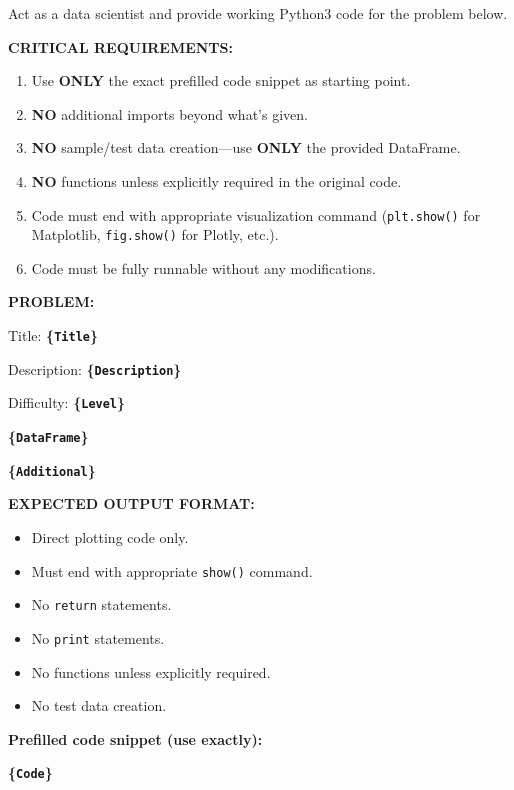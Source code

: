 \documentclass[conference]{IEEEtran}
\begin{document}
\begin{tcolorbox}[title=Prompt Template for Visualization Problems, colback=white, colframe=black]
\scriptsize
Act as a data scientist and provide working Python3 code for the problem below.

\textbf{CRITICAL REQUIREMENTS:}

\begin{enumerate}
    \item Use \textbf{ONLY} the exact prefilled code snippet as starting point.
    \item \textbf{NO} additional imports beyond what's given.
    \item \textbf{NO} sample/test data creation—use \textbf{ONLY} the provided DataFrame.
    \item \textbf{NO} functions unless explicitly required in the original code.
    \item Code must end with appropriate visualization command (\texttt{plt.show()} for Matplotlib, \texttt{fig.show()} for Plotly, etc.).
    \item Code must be fully runnable without any modifications.
\end{enumerate}

\textbf{PROBLEM:}

Title: \textbf{\{\texttt{Title}\}}

Description: \textbf{\{\texttt{Description}\}}

Difficulty: \textbf{\{\texttt{Level}\}}

\textbf{\{\texttt{DataFrame}\}}

\textbf{\{\texttt{Additional}\}}

\textbf{EXPECTED OUTPUT FORMAT:}

\begin{itemize}
    \item Direct plotting code only.
    \item Must end with appropriate \texttt{show()} command.
    \item No \texttt{return} statements.
    \item No \texttt{print} statements.
    \item No functions unless explicitly required.
    \item No test data creation.
\end{itemize}

\textbf{Prefilled code snippet (use exactly):}

\textbf{\{\texttt{Code}\}}
\end{tcolorbox}
\end{document}
